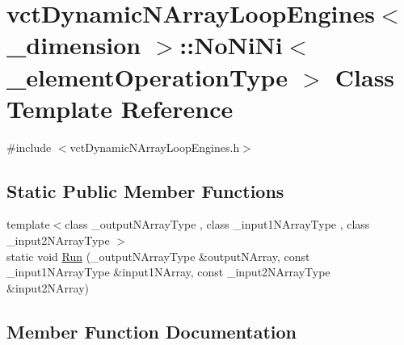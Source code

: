 \hypertarget{classvct_dynamic_n_array_loop_engines_1_1_no_ni_ni}{}\section{vct\+Dynamic\+N\+Array\+Loop\+Engines$<$ \+\_\+dimension $>$\+:\+:No\+Ni\+Ni$<$ \+\_\+element\+Operation\+Type $>$ Class Template Reference}
\label{classvct_dynamic_n_array_loop_engines_1_1_no_ni_ni}


{\ttfamily \#include $<$vct\+Dynamic\+N\+Array\+Loop\+Engines.\+h$>$}

\subsection*{Static Public Member Functions}
\begin{DoxyCompactItemize}
\item 
{\footnotesize template$<$class \+\_\+output\+N\+Array\+Type , class \+\_\+input1\+N\+Array\+Type , class \+\_\+input2\+N\+Array\+Type $>$ }\\static void \hyperlink{classvct_dynamic_n_array_loop_engines_1_1_no_ni_ni_a0b894eae797fdba3acdeb81c04ce3736}{Run} (\+\_\+output\+N\+Array\+Type \&output\+N\+Array, const \+\_\+input1\+N\+Array\+Type \&input1\+N\+Array, const \+\_\+input2\+N\+Array\+Type \&input2\+N\+Array)
\end{DoxyCompactItemize}


\subsection{Member Function Documentation}
\hypertarget{classvct_dynamic_n_array_loop_engines_1_1_no_ni_ni_a0b894eae797fdba3acdeb81c04ce3736}{}
